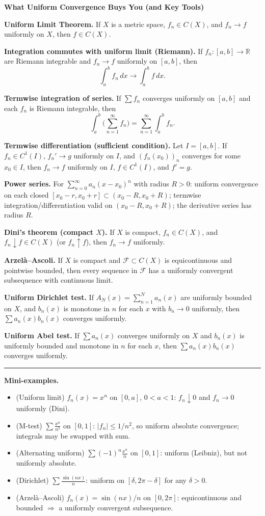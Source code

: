 \documentclass[12pt,a4paper]{article}
\theoremstyle{plain}
\theoremstyle{definition}
\theoremstyle{remark}
\theoremstyle{remark}
\newcommand{\probheader}[1]{%
	\par\vspace{8pt}%
	{\Large\bfseries #1\par}%
	\vspace{6pt}%
}
\newcommand{\sep}{\vspace{6pt}\hrule\vspace{8pt}}
\begin{document}
	\probheader{What Uniform Convergence Buys You (and Key Tools)}
	
	\textbf{Uniform Limit Theorem.}
	If $X$ is a metric space, $f_n\in C(X)$, and $f_n\to f$ uniformly on $X$, then $f\in C(X)$.
	
	\textbf{Integration commutes with uniform limit (Riemann).}
	If $f_n:[a,b]\to\mathbb{R}$ are Riemann integrable and $f_n\to f$ uniformly on $[a,b]$, then
	\[
	\int_a^b f_n \,dx \to \int_a^b f \,dx .
	\]
	
	\textbf{Termwise integration of series.}
	If $\sum f_n$ converges uniformly on $[a,b]$ and each $f_n$ is Riemann integrable, then
	\[
	\int_a^b \Big(\sum_{n=1}^\infty f_n\Big)=\sum_{n=1}^\infty \int_a^b f_n.
	\]
	
	\textbf{Termwise differentiation (sufficient condition).}
	Let $I=[a,b]$. If $f_n\in C^1(I)$, $f_n'\to g$ uniformly on $I$, and $(f_n(x_0))_n$ converges for some $x_0\in I$, then
	$f_n\to f$ uniformly on $I$, $f\in C^1(I)$, and $f'=g$.
	
	\textbf{Power series.}
	For $\sum_{n=0}^\infty a_n (x-x_0)^n$ with radius $R>0$:
	uniform convergence on each closed $[x_0-r,x_0+r]\subset (x_0-R,x_0+R)$;
	termwise integration/differentiation valid on $(x_0-R,x_0+R)$; the derivative series has radius $R$.
	
	\textbf{Dini’s theorem (compact $X$).}
	If $X$ is compact, $f_n\in C(X)$, and $f_n\downarrow f\in C(X)$ (or $f_n\uparrow f$), then $f_n\to f$ uniformly.
	
	\textbf{Arzel\`a--Ascoli.}
	If $X$ is compact and $\mathcal F\subset C(X)$ is equicontinuous and pointwise bounded, then every sequence in $\mathcal F$ has a uniformly convergent subsequence with continuous limit.
	
	\textbf{Uniform Dirichlet test.}
	If $A_N(x)=\sum_{n=1}^N a_n(x)$ are uniformly bounded on $X$, and $b_n(x)$ is monotone in $n$ for each $x$ with $b_n\to0$ uniformly, then $\sum a_n(x)b_n(x)$ converges uniformly.
	
	\textbf{Uniform Abel test.}
	If $\sum a_n(x)$ converges uniformly on $X$ and $b_n(x)$ is uniformly bounded and monotone in $n$ for each $x$, then $\sum a_n(x)b_n(x)$ converges uniformly.
	
	\sep
	
	\textbf{Mini-examples.}
	\begin{itemize}
		\item (Uniform limit) $f_n(x)=x^n$ on $[0,a]$, $0<a<1$: $f_n\downarrow 0$ and $f_n\to 0$ uniformly (Dini).
		\item (M-test) $\sum \frac{x^n}{n^2}$ on $[0,1]$: $|f_n|\le 1/n^2$, so uniform absolute convergence; integrals may be swapped with sum.
		\item (Alternating uniform) $\sum (-1)^n \frac{x^n}{n}$ on $[0,1]$: uniform (Leibniz), but not uniformly absolute.
		\item (Dirichlet) $\sum \frac{\sin(nx)}{n}$: uniform on $[\delta,2\pi-\delta]$ for any $\delta>0$.
		\item (Arzel\`a--Ascoli) $f_n(x)=\sin(nx)/n$ on $[0,2\pi]$: equicontinuous and bounded $\Rightarrow$ a uniformly convergent subsequence.
	\end{itemize}
	
\end{document}
